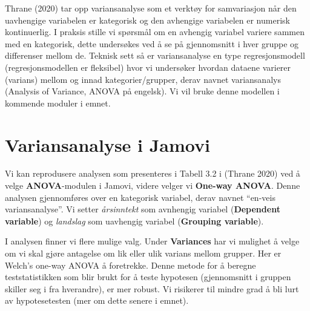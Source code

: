 \documentclass[
  letterpaper,
  DIV=11,
  numbers=noendperiod,
  oneside]{scrreprt}
\begin{document}
Thrane
(2020)
tar opp variansanalyse som et verktøy for samvariasjon når den
uavhengige variabelen er kategorisk og den avhengige variabelen er
numerisk kontinuerlig. I praksis stille vi spørsmål om en avhengig
variabel variere sammen med en kategorisk, dette undersøkes ved å se på
gjennomsnitt i hver gruppe og differenser mellom de. Teknisk sett så er
variansanalyse en type regresjonsmodell (regresjonsmodellen er
fleksibel) hvor vi undersøker hvordan dataene varierer (varians) mellom
og innad kategorier/grupper, derav navnet variansanalys (Analysis of
Variance, ANOVA på engelsk). Vi vil bruke denne modellen i kommende
moduler i emnet.

\hypertarget{variansanalyse-i-jamovi}{%
\section{Variansanalyse i Jamovi}\label{variansanalyse-i-jamovi}}

Vi kan reprodusere analysen som presenteres i Tabell 3.2 i (Thrane
2020)
ved å velge \textbf{ANOVA}-modulen i Jamovi, videre velger vi
\textbf{One-way ANOVA}. Denne analysen gjennomføres over en kategorisk
variabel, derav navnet ``en-veis variansanalyse''. Vi setter
\emph{årsinntekt} som avnhengig variabel (\textbf{Dependent variable})
og \emph{landslag} som uavhengig variabel (\textbf{Grouping variable}).

I analysen finner vi flere mulige valg. Under \textbf{Variances} har vi
mulighet å velge om vi skal gjøre antagelse om lik eller ulik varians
mellom grupper. Her er Welch's one-way ANOVA å foretrekke. Denne metode
for å beregne teststatistikken som blir brukt for å teste hypotesen
(gjennomsnitt i gruppen skiller seg i fra hverandre), er mer robust. Vi
risikerer til mindre grad å bli lurt av hypotesetesten (mer om dette
senere i emnet).
\end{document}
